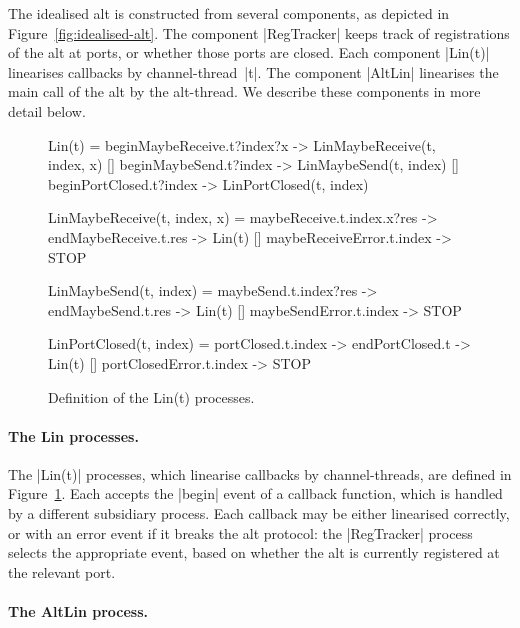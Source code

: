 The idealised alt is constructed from several components, as depicted in
Figure~\ref{fig:idealised-alt}.  The component |RegTracker| keeps track of
registrations of the alt at ports, or whether those ports are closed.  Each
component |Lin(t)| linearises callbacks by channel-thread~|t|.  The component
|AltLin| linearises the main call of the alt by the alt-thread.  We describe
these components in more detail below.


\begin{figure}
\begin{cspm}
Lin(t) = 
  beginMaybeReceive.t?index?x -> LinMaybeReceive(t, index, x)
  [] beginMaybeSend.t?index -> LinMaybeSend(t, index)
  [] beginPortClosed.t?index -> LinPortClosed(t, index)
  
LinMaybeReceive(t, index, x) = 
  maybeReceive.t.index.x?res -> endMaybeReceive.t.res -> Lin(t)
  [] maybeReceiveError.t.index -> STOP
  
LinMaybeSend(t, index) = 
  maybeSend.t.index?res -> endMaybeSend.t.res -> Lin(t)
  [] maybeSendError.t.index -> STOP
  
LinPortClosed(t, index) = 
  portClosed.t.index -> endPortClosed.t -> Lin(t)
  [] portClosedError.t.index -> STOP
\end{cspm}
\caption{Definition of the {\scalastyle Lin(t)}
  processes.  \label{fig:alt-lin}} 
\end{figure}


\paragraph{The {\scalashape Lin} processes.}

The |Lin(t)| processes, which linearise callbacks by channel-threads, are
defined in Figure~\ref{fig:alt-lin}.  Each accepts the |begin| event of a
callback function, which is handled by a different subsidiary process.  Each
callback may be either linearised correctly, or with an error event if it
breaks the alt protocol: the |RegTracker| process selects the appropriate
event, based on whether the alt is currently registered at the relevant port.


\paragraph{The {\scalashape AltLin} process.}

